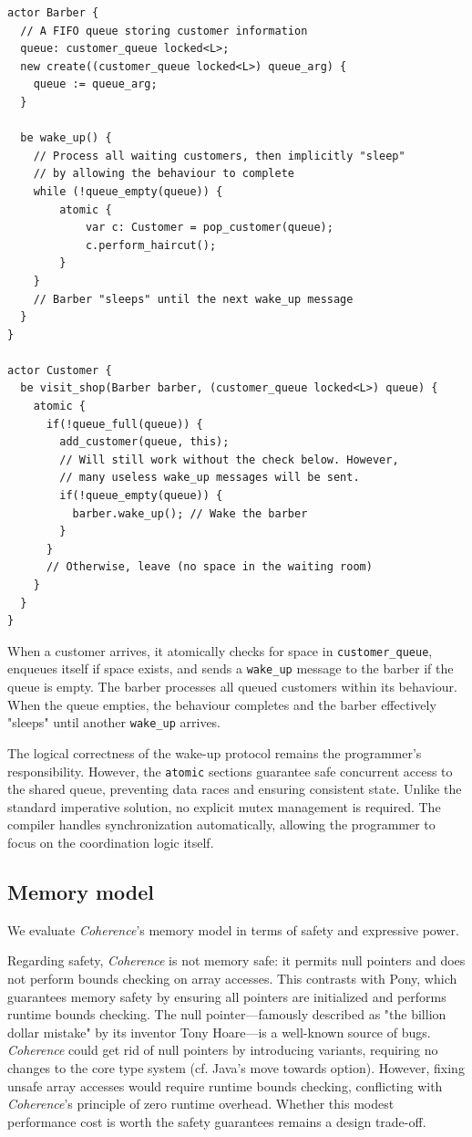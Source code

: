 \begin{verbatim}
actor Barber {
  // A FIFO queue storing customer information
  queue: customer_queue locked<L>;
  new create((customer_queue locked<L>) queue_arg) {
    queue := queue_arg;
  }

  be wake_up() {
    // Process all waiting customers, then implicitly "sleep"
    // by allowing the behaviour to complete
    while (!queue_empty(queue)) {
        atomic {
            var c: Customer = pop_customer(queue);
            c.perform_haircut();
        }
    }
    // Barber "sleeps" until the next wake_up message
  }
}

actor Customer {
  be visit_shop(Barber barber, (customer_queue locked<L>) queue) {
    atomic {
      if(!queue_full(queue)) {
        add_customer(queue, this);
        // Will still work without the check below. However,
        // many useless wake_up messages will be sent.
        if(!queue_empty(queue)) {
          barber.wake_up(); // Wake the barber
        }
      }
      // Otherwise, leave (no space in the waiting room)
    }
  }
}
\end{verbatim}

When a customer arrives, it atomically checks for space in \texttt{customer\_queue}, enqueues itself if space exists, and sends a \texttt{wake\_up} message to the barber if the queue is empty. The barber processes all queued customers within its behaviour. When the queue empties, the behaviour completes and the barber effectively "sleeps" until another \texttt{wake\_up} arrives.

The logical correctness of the wake-up protocol remains the programmer's responsibility. However, the \texttt{atomic} sections guarantee safe concurrent access to the shared queue, preventing data races and ensuring consistent state. Unlike the standard imperative solution, no explicit mutex management is required. The compiler handles synchronization automatically, allowing the programmer to focus on the coordination logic itself.

\subsection{Memory model} \label{sec:memory_model}
We evaluate \textit{Coherence}'s memory model in terms of safety and expressive power.

Regarding safety, \textit{Coherence} is not memory safe: it permits null pointers and does not perform bounds checking on array accesses. This contrasts with Pony, which guarantees memory safety by ensuring all pointers are initialized and performs runtime bounds checking. The null pointer---famously described as "the billion dollar mistake" by its inventor Tony Hoare\cite{hoare_null}---is a well-known source of bugs. \textit{Coherence} could get rid of null pointers by introducing variants, requiring no changes to the core type system (cf. Java's move towards option). However, fixing unsafe array accesses would require runtime bounds checking, conflicting with \textit{Coherence}'s principle of zero runtime overhead. Whether this modest performance cost is worth the safety guarantees remains a design trade-off.

